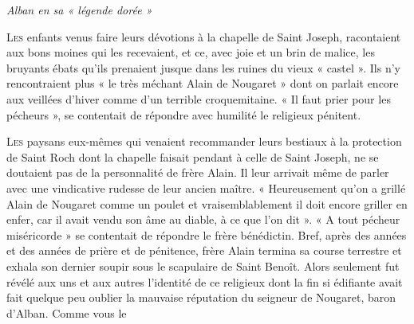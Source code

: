 
\begin{center}
    {\Large\itshape Alban en sa « légende dorée »}
\end{center}

\medskip

\lettrine[lines=2]{L}{es} enfants venus faire leurs dévotions à la chapelle de Saint Joseph,
racontaient aux bons moines qui les recevaient, et ce, avec joie et un brin
de malice, les bruyants ébats qu’ils prenaient jusque dans les ruines du
vieux « castel ». Ils n’y rencontraient plus « le très méchant Alain de
Nougaret » dont on parlait encore aux veillées d’hiver comme d’un terrible
croquemitaine. « Il faut prier pour les pécheurs », se contentait de répondre
avec humilité le religieux pénitent.

\medskip

\lettrine[lines=2]{L}{es} paysans eux-mêmes qui venaient recommander leurs bestiaux à la
protection de Saint Roch dont la chapelle faisait pendant à celle de
Saint Joseph, ne se doutaient pas de la personnalité de frère Alain.
Il leur arrivait même de parler avec une vindicative rudesse de leur ancien
maître. « Heureusement qu’on a grillé Alain de Nougaret comme un poulet
et vraisemblablement il doit encore griller en enfer, car il avait vendu son
âme au diable, à ce que l’on dit ». « A tout pécheur miséricorde » se
contentait de répondre le frère bénédictin. Bref, après des années et des
années de prière et de pénitence, frère Alain termina sa course terrestre
et exhala son dernier soupir sous le scapulaire de Saint Benoît. Alors
seulement fut révélé aux uns et aux autres l’identité de ce religieux dont
la fin si édifiante avait fait quelque peu oublier la mauvaise réputation
du seigneur de Nougaret, baron d’Alban. Comme vous le
